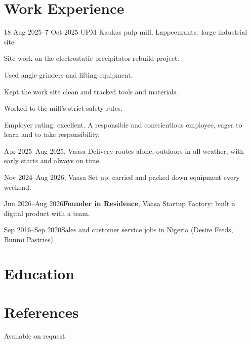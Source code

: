 \documentclass[a4paper,11pt]{article}
\begin{document}
\section{Work Experience}
\begin{cventry}{18 Aug 2025--7 Oct 2025}{}
  UPM Kaukas pulp mill, Lappeenranta: large industrial site\par
  Site work on the electrostatic precipitator rebuild project.\par
  Used angle grinders and lifting equipment.\par
  Kept the work site clean and tracked tools and materials.\par
  Worked to the mill's strict safety rules.\par
  Employer rating: excellent. A responsible and conscientious employee, eager to learn and to take responsibility.
\end{cventry}
\begin{cventry}{Apr 2025--Aug 2025}{, Vaasa}
  Delivery routes alone, outdoors in all weather, with early starts and always on time.
\end{cventry}
\begin{cventry}{Nov 2024--Aug 2026}{, Vaasa}
  Set up, carried and packed down equipment every weekend.
\end{cventry}
\begin{cventry}{Jun 2026--Aug 2026}{\textbf{Founder in Residence}, Vaasa Startup Factory: built a digital product with a team.}
\end{cventry}
\begin{cventry}{Sep 2016--Sep 2020}{Sales and customer service jobs in Nigeria (Desire Feeds, Bunmi Pastries).}
\end{cventry}

\section{Education}

\section{References}
Available on request.
\end{document}
